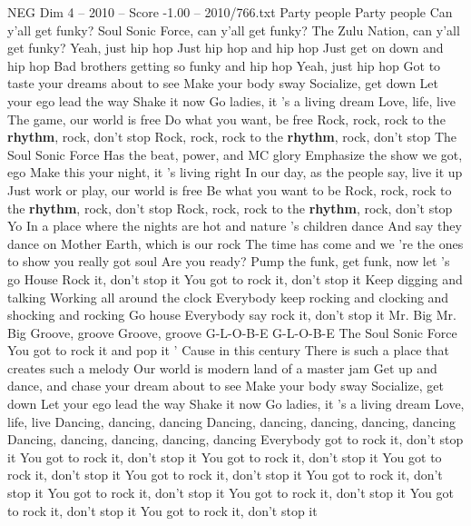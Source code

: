 \begin{textsample}{NEG Dim 4 – 2010 – Score -1.00 – 2010/766.txt}  \label{ex:f4_neg_007}
Party people Party people Can y'all get funky?
Soul Sonic Force, can y'all get funky?
The Zulu Nation, can y'all get funky?
Yeah, just hip hop Just hip hop and hip hop Just get on down and hip hop Bad brothers getting so funky and hip hop Yeah, just hip hop Got to taste your dreams about to see Make your body sway Socialize, get down Let your ego lead the way Shake it now Go ladies, it 's a living dream Love, life, live The game, our world is free Do what you want, be free Rock, rock, rock to the \textbf{rhythm}, rock, don't stop Rock, rock, rock to the \textbf{rhythm}, rock, don't stop The Soul Sonic Force Has the beat, power, and MC glory Emphasize the show we got, ego Make this your night, it 's living right In our day, as the people say, live it up Just work or play, our world is free Be what you want to be Rock, rock, rock to the \textbf{rhythm}, rock, don't stop Rock, rock, rock to the \textbf{rhythm}, rock, don't stop Yo In a place where the nights are hot and nature 's children dance And say they dance on Mother Earth, which is our rock The time has come and we 're the ones to show you really got soul Are you ready?
Pump the funk, get funk, now let 's go House Rock it, don't stop it You got to rock it, don't stop it Keep digging and talking Working all around the clock Everybody keep rocking and clocking and shocking and rocking Go house Everybody say rock it, don't stop it Mr.
Big Mr.
Big Groove, groove Groove, groove G-L-O-B-E G-L-O-B-E The Soul Sonic Force You got to rock it and pop it ' Cause in this century There is such a place that creates such a melody Our world is modern land of a master jam Get up and dance, and chase your dream about to see Make your body sway Socialize, get down Let your ego lead the way Shake it now Go ladies, it 's a living dream Love, life, live Dancing, dancing, dancing Dancing, dancing, dancing, dancing, dancing Dancing, dancing, dancing, dancing, dancing Everybody got to rock it, don't stop it You got to rock it, don't stop it You got to rock it, don't stop it You got to rock it, don't stop it You got to rock it, don't stop it You got to rock it, don't stop it You got to rock it, don't stop it You got to rock it, don't stop it You got to rock it, don't stop it You got to rock it, don't stop it

\end{textsample}
